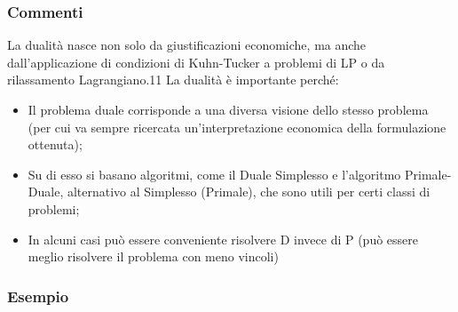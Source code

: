 \documentclass[12pt,a4paper]{article}
\begin{document}
\subsubsection{Commenti}
La dualità nasce non solo da giustificazioni economiche, ma anche dall'applicazione di condizioni di Kuhn-Tucker a problemi di LP o da rilassamento Lagrangiano.11
La dualità è importante perché:
\begin{itemize}
\item Il problema duale corrisponde a una diversa visione dello stesso problema (per cui va sempre ricercata un'interpretazione economica della formulazione ottenuta);
\item Su di esso si basano algoritmi, come il Duale Simplesso e l'algoritmo Primale-Duale, alternativo al Simplesso (Primale), che sono utili per certi classi di problemi;
\item In alcuni casi può essere conveniente risolvere D invece di P (può essere meglio risolvere il problema con meno vincoli)
\end{itemize}

\subsubsection{Esempio}
\begin{Parallel}{0.45 \textwidth}{0.45 \textwidth}
\end{Parallel}
\end{document}
